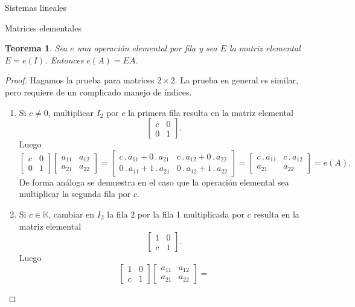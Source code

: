 \documentclass[a4paper,12pt,twoside,spanish]{amsbook}
\newtheorem{teorema}{Teorema}[section]
\theoremstyle{definition}
\theoremstyle{remark}
\newcommand{\K}{\mathbb K}
\begin{document}
\begin{chapter}{Sistemas lineales}
\begin{section}{Matrices elementales}
			\begin{teorema}\label{th-mrtx-elem}
				Sea $e$ una operación elemental por fila y sea $E$ la matriz elemental $E=e(I)$. Entonces $e(A) = EA$.
			\end{teorema}
			\begin{proof}
				Hagamos la prueba para matrices $2 \times 2$. La prueba en general es similar, pero requiere de un complicado manejo de índices.
				\begin{enumerate}
					\item Si $c \not=0$, multiplicar $I_2$ por  $c$ la primera fila resulta en la matriz elemental
					\begin{equation*}
					\begin{bmatrix} c& 0\\ 0&1\end{bmatrix}.
					\end{equation*}
					Luego
					\begin{equation*}
					\begin{bmatrix} c& 0\\ 0&1\end{bmatrix}
					\begin{bmatrix} a_{11}&a_{12}\\a_{21}&a_{22}\end{bmatrix} = 
					\begin{bmatrix} 
					c\,.\,a_{11} + 0 \,.\,a_{21}&c\,.\,a_{12}+0\,.\,a_{22}\\
					0\,.\,a_{11} + 1 \,.\,a_{21}&0\,.\,a_{12}+1\,.\,a_{22}\end{bmatrix}
					=
					\begin{bmatrix} 
					c\,.\,a_{11}&c\,.\,a_{12}\\
					a_{21}&a_{22}\end{bmatrix} = e(A).
					\end{equation*}
					De forma análoga se demuestra en el caso que la operación elemental sea  multiplicar la segunda fila por $c$.
					\item Si  $c \in \K$, cambiar en $I_2$ la fila 2 por la fila 1 multiplicada por $c$ resulta en la matriz elemental 
					\begin{equation*}
					\begin{bmatrix} 1& 0\\ c&1\end{bmatrix}.
					\end{equation*}
					Luego 
					\begin{equation*}
					\begin{bmatrix} 1& 0\\ c&1\end{bmatrix}	\begin{bmatrix} a_{11}&a_{12}\\a_{21}&a_{22}\end{bmatrix} = 

\end{equation*}
\end{enumerate}
\end{proof}
\end{section}
\end{chapter}
\end{document}
